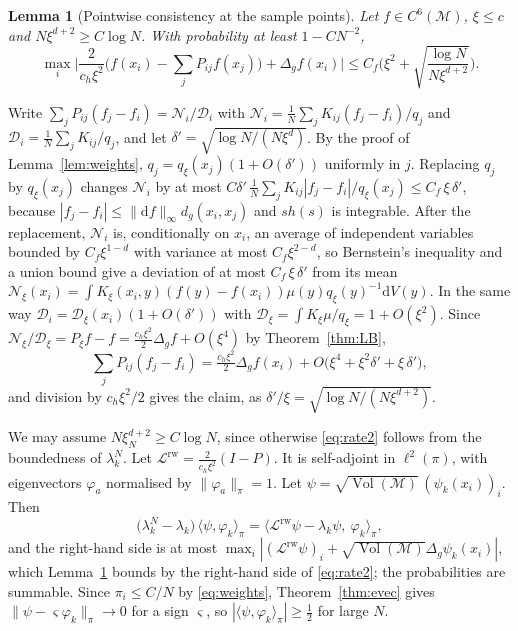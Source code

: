 \documentclass[11pt,a4paper]{article}
\makeatletter
\theoremstyle{stmt}
\newtheorem{lemma}[theorem]{Lemma}
\theoremstyle{defn}
\theoremstyle{rmk}
\renewenvironment{proof}[1][\proofname]{\par\pushQED{\qed}\normalfont\topsep6\p@\@plus6\p@\relax
  \trivlist\item[\hskip\labelsep{\sffamily\itshape\small #1.}]\ignorespaces}{\popQED\endtrivlist\@endpefalse}
\numberwithin{equation}{section}
\DeclareMathOperator{\Vol}{Vol}
\newcommand{\M}{\mathcal{M}}
\newcommand{\Lc}{\mathcal{L}}
\newcommand{\dd}{\mathrm{d}}
\makeatother
\begin{document}
\begin{lemma}[Pointwise consistency at the sample points]\label{lem:pointwise}
Let $f\in C^6(\M)$, $\xi\le c$ and $N\xi^{d+2}\ge C\log N$. With probability at least $1-CN^{-2}$,
\begin{equation}
\max_i\Big|\frac{2}{c_h\xi^2}\Big(f(x_i)-\sum_jP_{ij}f(x_j)\Big)+\Delta_gf(x_i)\Big|\le C_f\Big(\xi^2+\sqrt{\frac{\log N}{N\xi^{d+2}}}\Big).
\end{equation}
\end{lemma}

\begin{proof}
Write $\sum_jP_{ij}(f_j-f_i)=\mathcal N_i/\mathcal D_i$ with $\mathcal N_i=\frac1N\sum_jK_{ij}(f_j-f_i)/q_j$ and $\mathcal D_i=\frac1N\sum_jK_{ij}/q_j$, and let $\delta'=\sqrt{\log N/(N\xi^d)}$. By the proof of Lemma~\ref{lem:weights}, $q_j=q_\xi(x_j)(1+O(\delta'))$ uniformly in $j$. Replacing $q_j$ by $q_\xi(x_j)$ changes $\mathcal N_i$ by at most $C\delta'\,\frac1N\sum_jK_{ij}|f_j-f_i|/q_\xi(x_j)\le C_f\,\xi\,\delta'$, because $|f_j-f_i|\le\|\dd f\|_\infty d_g(x_i,x_j)$ and $sh(s)$ is integrable. After the replacement, $\mathcal N_i$ is, conditionally on $x_i$, an average of independent variables bounded by $C_f\xi^{1-d}$ with variance at most $C_f\xi^{2-d}$, so Bernstein's inequality and a union bound give a deviation of at most $C_f\,\xi\,\delta'$ from its mean $\mathcal N_\xi(x_i)=\int K_\xi(x_i,y)(f(y)-f(x_i))\mu(y)q_\xi(y)^{-1}\dd V(y)$. In the same way $\mathcal D_i=\mathcal D_\xi(x_i)(1+O(\delta'))$ with $\mathcal D_\xi=\int K_\xi\mu/q_\xi=1+O(\xi^2)$. Since $\mathcal N_\xi/\mathcal D_\xi=P_\xi f-f=\tfrac{c_h\xi^2}{2}\Delta_gf+O(\xi^4)$ by Theorem~\ref{thm:LB},
\[
\sum_jP_{ij}(f_j-f_i)=\tfrac{c_h\xi^2}{2}\Delta_gf(x_i)+O\big(\xi^4+\xi^2\delta'+\xi\,\delta'\big),
\]
and division by $c_h\xi^2/2$ gives the claim, as $\delta'/\xi=\sqrt{\log N/(N\xi^{d+2})}$.
\end{proof}

\begin{proof}[Proof of Theorem~\ref{thm:rate2}]
We may assume $N\xi_N^{d+2}\ge C\log N$, since otherwise \eqref{eq:rate2} follows from the boundedness of $\lambda_k^N$. Let $\Lc^{\mathrm{rw}}=\tfrac{2}{c_h\xi^2}(I-P)$. It is self-adjoint in $\ell^2(\pi)$, with eigenvectors $\varphi_a$ normalised by $\|\varphi_a\|_\pi=1$. Let $\psi=\sqrt{\Vol(\M)}\,(\psi_k(x_i))_i$. Then
\[
\big(\lambda_k^N-\lambda_k\big)\,\langle\psi,\varphi_k\rangle_\pi=\big\langle\Lc^{\mathrm{rw}}\psi-\lambda_k\psi,\ \varphi_k\big\rangle_\pi ,
\]
and the right-hand side is at most $\max_i|(\Lc^{\mathrm{rw}}\psi)_i+\sqrt{\Vol(\M)}\Delta_g\psi_k(x_i)|$, which Lemma~\ref{lem:pointwise} bounds by the right-hand side of \eqref{eq:rate2}; the probabilities are summable. Since $\pi_i\le C/N$ by \eqref{eq:weights}, Theorem~\ref{thm:evec} gives $\|\psi-\varsigma\varphi_k\|_\pi\to0$ for a sign $\varsigma$, so $|\langle\psi,\varphi_k\rangle_\pi|\ge\tfrac12$ for large $N$.
\end{proof}
\end{document}
